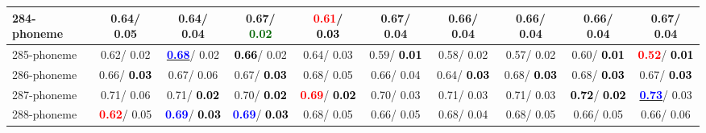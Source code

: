 \begin{table}[h]
\begin{center}
{\begin{tabular}{lc|c|c|c|c|c|c|c|c}
284-phoneme &   0.64/  0.05 &   0.64/  0.04 &   0.67/\textcolor{darkgreen}{\textbf{  0.02}} & \textcolor{red}{\textbf{  0.61}}/\textcolor{black}{\textbf{  0.03}} &   0.67/  0.04 &   0.66/  0.04 &   0.66/  0.04 &   0.66/  0.04 &   0.67/  0.04 \\ \hline
285-phoneme &   0.62/  0.02 & \underline{\textcolor{blue}{\textbf{  0.68}}}/  0.02 & \textcolor{black}{\textbf{  0.66}}/  0.02 &   0.64/  0.03 &   0.59/\textcolor{black}{\textbf{  0.01}} &   0.58/  0.02 &   0.57/  0.02 &   0.60/\textcolor{black}{\textbf{  0.01}} & \textcolor{red}{\textbf{  0.52}}/\textcolor{black}{\textbf{  0.01}} \\
286-phoneme &   0.66/\textcolor{black}{\textbf{  0.03}} &   0.67/  0.06 &   0.67/\textcolor{black}{\textbf{  0.03}} &   0.68/  0.05 &   0.66/  0.04 &   0.64/\textcolor{black}{\textbf{  0.03}} &   0.68/\textcolor{black}{\textbf{  0.03}} &   0.68/\textcolor{black}{\textbf{  0.03}} &   0.67/\textcolor{black}{\textbf{  0.03}} \\
287-phoneme &   0.71/  0.06 &   0.71/\textcolor{black}{\textbf{  0.02}} &   0.70/\textcolor{black}{\textbf{  0.02}} & \textcolor{red}{\textbf{  0.69}}/\textcolor{black}{\textbf{  0.02}} &   0.70/  0.03 &   0.71/  0.03 &   0.71/  0.03 & \textcolor{black}{\textbf{  0.72}}/\textcolor{black}{\textbf{  0.02}} & \underline{\textcolor{blue}{\textbf{  0.73}}}/  0.03 \\
288-phoneme & \textcolor{red}{\textbf{  0.62}}/  0.05 & \textcolor{blue}{\textbf{  0.69}}/\textcolor{black}{\textbf{  0.03}} & \textcolor{blue}{\textbf{  0.69}}/\textcolor{black}{\textbf{  0.03}} &   0.68/  0.05 &   0.66/  0.05 &   0.68/  0.04 &   0.68/  0.05 &   0.66/  0.05 &   0.66/  0.06 \\\end{tabular}}\label{stratsALCKappa8Allallb}
\end{center}
\end{table}
